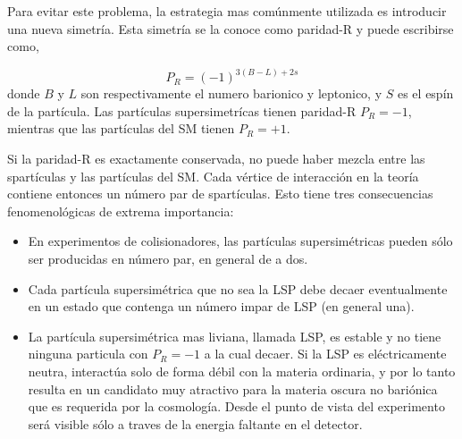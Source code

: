 Para evitar este problema, la estrategia mas comúnmente utilizada es introducir
una nueva simetría. Esta simetría se la conoce como paridad-R y puede escribirse
como,

\begin{equation}
  P_R = (-1)^{3(B-L)+ 2s}
\end{equation}
%
donde $B$ y $L$ son respectivamente el numero barionico y leptonico, y $S$ es el
espín de la partícula. Las partículas supersimetrícas tienen paridad-R $P_R = -1$, mientras
que las partículas del SM tienen $P_R = +1$.

Si la paridad-R es exactamente conservada, no puede haber mezcla entre las
spartículas y las partículas del SM. Cada vértice de interacción en la
teoría contiene entonces un número par de spartículas. Esto tiene tres consecuencias
fenomenológicas de extrema importancia:

\begin{itemize}
\item En experimentos de colisionadores, las partículas supersimétricas pueden
  sólo ser producidas en número par, en general de a dos.
\item Cada partícula supersimétrica que no sea la LSP debe decaer eventualmente
  en un estado que contenga un número impar de LSP (en general una).
\item La partícula supersimétrica mas liviana, llamada LSP, es estable y no tiene
  ninguna particula con $P_R = -1$ a la cual decaer. Si
  la LSP es eléctricamente neutra, interactúa solo de forma débil con la materia
  ordinaria, y por lo tanto resulta en un candidato muy atractivo para la
  materia oscura no bariónica que es requerida por la cosmología. Desde el punto de
  vista del experimento será visible sólo a traves de la energia faltante en el detector.
\end{itemize}





